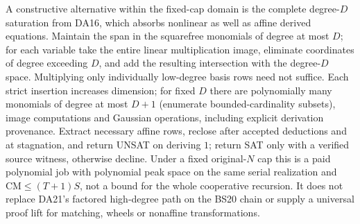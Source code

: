 \documentclass[11pt]{article}
\begin{document}
A constructive alternative within the fixed-cap domain is the complete degree-$D$ saturation from DA16, which absorbs nonlinear as well as affine derived equations. Maintain the span in the squarefree monomials of degree at most $D$; for each variable take the entire linear multiplication image, eliminate coordinates of degree exceeding $D$, and add the resulting intersection with the degree-$D$ space. Multiplying only individually low-degree basis rows need not suffice. Each strict insertion increases dimension; for fixed $D$ there are polynomially many monomials of degree at most $D+1$ (enumerate bounded-cardinality subsets), image computations and Gaussian operations, including explicit derivation provenance. Extract necessary affine rows, reclose after accepted deductions and at stagnation, and return UNSAT on deriving $1$; return SAT only with a verified source witness, otherwise decline. Under a fixed original-$N$ cap this is a paid polynomial job with polynomial peak space on the same serial realization and $\mathrm{CM}\le(T+1)S$, not a bound for the whole cooperative recursion. It does not replace DA21's factored high-degree path on the BS20 chain or supply a universal proof lift for matching, wheels or nonaffine transformations.
\end{document}
